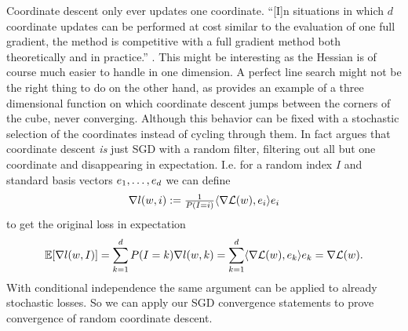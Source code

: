 Coordinate descent only ever updates one coordinate. ``[I]n situations in which
\(d\) coordinate updates can be performed at cost similar to the evaluation of
one full gradient, the method is competitive with a full gradient method both
theoretically and in practice.'' \parencite[7.3, p.
72]{bottouOptimizationMethodsLargeScale2018}. This might be interesting as the
Hessian is of course much easier to handle in one dimension. A perfect line
search might not be the right thing to do on the other hand, as
\textcite{powellSearchDirectionsMinimization1973} provides an example of a
three dimensional function on which coordinate descent jumps between the
corners of the cube, never converging. Although this behavior can be fixed
with a stochastic selection of the coordinates instead of cycling through them.
In fact \textcite{bubeckConvexOptimizationAlgorithms2015} argues that coordinate
descent \emph{is} just SGD with a random filter, filtering out all
but one coordinate and disappearing in expectation. I.e. for a random index \(I\)
and standard basis vectors \(e_1,\dots,e_d\) we can
define
\begin{align*}
	\nabla l(w, i)
	:= \tfrac1{P(I=i)} \langle \nabla\mathcal{L}(w), e_i \rangle e_i
\end{align*}
to get the original loss in expectation
\begin{align*}
	\mathbb{E}[\nabla l(w,I)] = \sum_{k=1}^d P(I=k) \nabla l(w,k)
	= \sum_{k=1}^d \langle \nabla\mathcal{L}(w), e_k\rangle e_k
	= \nabla\mathcal{L}(w).
\end{align*}
With conditional independence the same argument can be applied to already
stochastic losses. So we can apply our SGD convergence statements to prove
convergence of random coordinate descent.





\endinput
